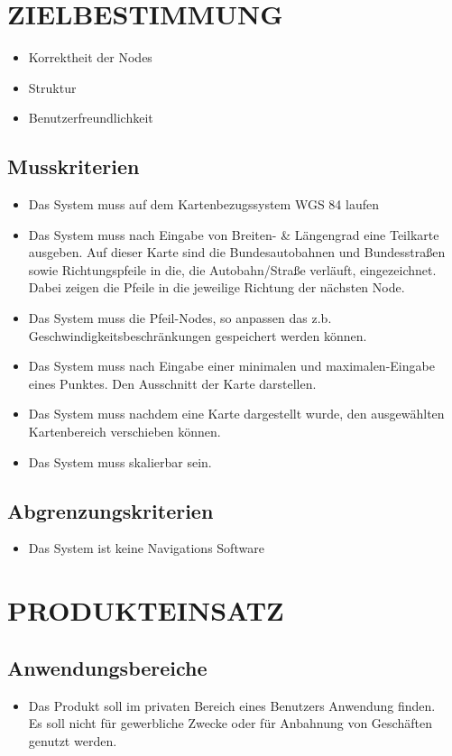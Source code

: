 \newpage
	\section{\Large ZIELBESTIMMUNG}
	\begin{itemize}
		\item Korrektheit der Nodes
		\item Struktur
		\item Benutzerfreundlichkeit
	\end{itemize}
	\subsection{Musskriterien}
	\begin{itemize}
		\item Das System muss auf dem Kartenbezugssystem WGS 84 laufen
		\item Das System muss nach Eingabe von Breiten- \& Längengrad eine Teilkarte ausgeben. Auf dieser Karte sind die Bundesautobahnen und Bundesstraßen sowie Richtungspfeile in die, die Autobahn/Straße verläuft, eingezeichnet. Dabei zeigen die Pfeile in die jeweilige Richtung der nächsten Node.
		\item Das System muss die Pfeil-Nodes, so anpassen das z.b. Geschwindigkeitsbeschränkungen gespeichert werden können.
		\item Das System muss nach Eingabe einer minimalen und maximalen-Eingabe eines Punktes. Den Ausschnitt der Karte darstellen.
		\item Das System muss nachdem eine Karte dargestellt wurde, den ausgewählten Kartenbereich verschieben können.
		\item Das System muss skalierbar sein.
	\end{itemize}
	\subsection{Abgrenzungskriterien}
	\begin{itemize}
		\item Das System ist keine Navigations Software
	\end{itemize}
	
	\section{\Large PRODUKTEINSATZ}
	\subsection{Anwendungsbereiche}
	\begin{itemize}
		\item Das Produkt soll im privaten Bereich eines Benutzers Anwendung finden.\\
		Es soll nicht für gewerbliche Zwecke oder für Anbahnung von Geschäften genutzt werden.
	\end{itemize}
